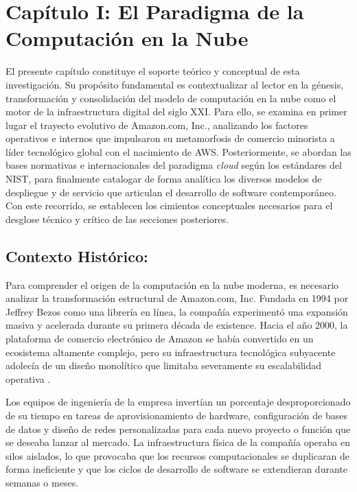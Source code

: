 \documentclass[12pt,a4paper]{article}
\begin{document}
\section{Capítulo I: El Paradigma de la Computación en la Nube}

El presente capítulo constituye el soporte teórico y conceptual de esta investigación. Su propósito fundamental es contextualizar al lector en la génesis, transformación y consolidación del modelo de computación en la nube como el motor de la infraestructura digital del siglo XXI. Para ello, se examina en primer lugar el trayecto evolutivo de Amazon.com, Inc., analizando los factores operativos e internos que impulsaron su metamorfosis de comercio minorista a líder tecnológico global con el nacimiento de AWS. Posteriormente, se abordan las bases normativas e internacionales del paradigma \textit{cloud} según los estándares del NIST, para finalmente catalogar de forma analítica los diversos modelos de despliegue y de servicio que articulan el desarrollo de software contemporáneo. Con este recorrido, se establecen los cimientos conceptuales necesarios para el desglose técnico y crítico de las secciones posteriores.

\subsection{Contexto Histórico: }

Para comprender el origen de la computación en la nube moderna, es necesario analizar la transformación estructural de Amazon.com, Inc. Fundada en 1994 por Jeffrey Bezos como una librería en línea, la compañía experimentó una expansión masiva y acelerada durante su primera década de existence. Hacia el año 2000, la plataforma de comercio electrónico de Amazon se había convertido en un ecosistema altamente complejo, pero su infraestructura tecnológica subyacente adolecía de un diseño monolítico que limitaba severamente su escalabilidad operativa \parencite{varia2014}. 

Los equipos de ingeniería de la empresa invertían un porcentaje desproporcionado de su tiempo en tareas de aprovisionamiento de hardware, configuración de bases de datos y diseño de redes personalizadas para cada nuevo proyecto o función que se deseaba lanzar al mercado. La infraestructura física de la compañía operaba en silos aislados, lo que provocaba que los recursos computacionales se duplicaran de forma ineficiente y que los ciclos de desarrollo de software se extendieran durante semanas o meses. 
\end{document}
